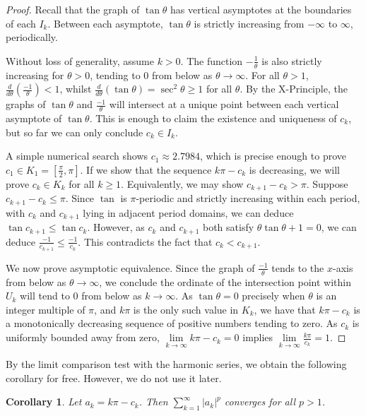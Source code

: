 \documentclass{amsart}
\theoremstyle{plain}
\numberwithin{theorem}{section}
\newtheorem{corollary}[theorem]{Corollary}
\theoremstyle{definition}
\theoremstyle{remark}
\theoremstyle{brakets}
\begin{document}
\begin{proof}
 Recall that the graph of $\tan \theta$ has vertical asymptotes at the boundaries of each $I_k$. Between each asymptote, $\tan \theta$ is strictly increasing from $-\infty$ to $\infty$, periodically. 

    Without loss of generality, assume $k > 0$. The function $-\frac{1}{\theta}$ is also strictly increasing for $\theta > 0$, tending to $0$ from below as $\theta \to \infty$. For all $\theta > 1$, $\frac{d}{d\theta}(\frac{-1}{\theta}) < 1$, whilst $\frac{d}{d\theta} (\tan \theta) = \sec^2 \theta \geq 1$ for all $\theta$. By the X-Principle, the graphs of $\tan \theta$ and $\frac{-1}{\theta}$ will intersect at a unique point between each vertical asymptote of $\tan \theta$. This is enough to claim the existence and uniqueness of $c_k$, but so far we can only conclude $c_k \in I_k$.

    A simple numerical search shows $c_1 \approx 2.7984$, which is precise enough to prove $c_1 \in K_1 = [\frac{\pi}{2},\pi]$. If we show that the sequence $k\pi - c_k$ is decreasing, we will prove $c_k \in K_k$ for all $k \geq 1$. Equivalently, we may show $c_{k+1} - c_k > \pi$. Suppose $c_{k+1} - c_k \leq \pi$. Since $\tan$ is $\pi$-periodic and strictly increasing within each period, with $c_k$ and $c_{k+1}$ lying in adjacent period domains, we can deduce $\tan c_{k+1} \leq \tan c_k$. However, as $c_k$ and $c_{k+1}$ both satisfy $\theta \tan \theta + 1 = 0$, we can deduce $\frac{-1}{c_{k+1}} \leq \frac{-1}{c_k}$. This contradicts the fact that $c_k < c_{k+1}$.
    
    We now prove asymptotic equivalence. Since the graph of $\frac{-1}{\theta}$ tends to the $x$-axis from below as $\theta \to \infty$, we conclude the ordinate of the intersection point within $U_k$ will tend to $0$ from below as $k \to \infty$. As $\tan \theta = 0$ precisely when $\theta$ is an integer multiple of $\pi$, and $k\pi$ is the only such value in $K_k$, we have that $k\pi - c_k$ is a monotonically decreasing sequence of positive numbers tending to zero. As $c_k$ is uniformly bounded away from zero, $\lim\limits_{k \to \infty} k\pi - c_k =0$ implies $\lim\limits_{k \to \infty} \frac{k\pi}{c_k} = 1$.
\end{proof}

By the limit comparison test with the harmonic series, we obtain the following corollary for free. However, we do not use it later. 
\begin{corollary} Let $a_k = k\pi - c_k$. Then $\sum\limits_{k=1}^\infty |a_k|^p$ converges for all $p > 1$.
\end{corollary}
\end{document}
